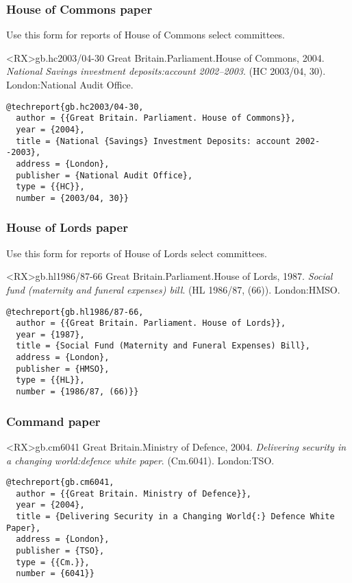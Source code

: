 \documentclass[10pt,a4paper]{article}
\begin{document}
\subsubsection*{House of Commons paper}

Use this form for reports of House of Commons select committees.

\begin{bibexbox}<RX>{gb.hc2003/04-30}
  Great Britain.\@ Parliament.\@ House of Commons, 2004. \emph{National Savings investment deposits:\@ account 2002--2003}. (HC 2003/04, 30). London:\@ National Audit Office.
  \tcblower
\begin{Verbatim}
@techreport{gb.hc2003/04-30,
  author = {{Great Britain. Parliament. House of Commons}},
  year = {2004},
  title = {National {Savings} Investment Deposits: account 2002--2003},
  address = {London},
  publisher = {National Audit Office},
  type = {{HC}},
  number = {2003/04, 30}}
\end{Verbatim}
\end{bibexbox}

\subsubsection*{House of Lords paper}

Use this form for reports of House of Lords select committees.

\begin{bibexbox}<RX>{gb.hl1986/87-66}
  Great Britain.\@ Parliament.\@ House of Lords, 1987. \emph{Social fund (maternity and funeral expenses) bill}. (HL 1986/87, (66)). London:\@ HMSO.
  \tcblower
\begin{Verbatim}
@techreport{gb.hl1986/87-66,
  author = {{Great Britain. Parliament. House of Lords}},
  year = {1987},
  title = {Social Fund (Maternity and Funeral Expenses) Bill},
  address = {London},
  publisher = {HMSO},
  type = {{HL}},
  number = {1986/87, (66)}}
\end{Verbatim}
\end{bibexbox}


\subsubsection*{Command paper}

\begin{bibexbox}<RX>{gb.cm6041}
  Great Britain.\@ Ministry of Defence, 2004. \emph{Delivering security in a changing world:\@ defence white paper}. (Cm.\@ 6041). London:\@ TSO.
  \tcblower
\begin{Verbatim}
@techreport{gb.cm6041,
  author = {{Great Britain. Ministry of Defence}},
  year = {2004},
  title = {Delivering Security in a Changing World{:} Defence White Paper},
  address = {London},
  publisher = {TSO},
  type = {{Cm.}},
  number = {6041}}
\end{Verbatim}
\end{bibexbox}
\end{document}
